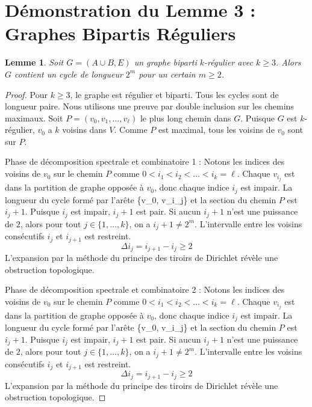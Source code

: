 \documentclass[11pt,a4paper]{article}
\newtheorem{lemma}[theorem]{Lemme}
\theoremstyle{definition}
\begin{document}
\section{Démonstration du Lemme 3 : Graphes Bipartis Réguliers}
\begin{lemma}
Soit $G = (A \cup B, E)$ un graphe biparti $k$-régulier avec $k \ge 3$. Alors $G$ contient un cycle de longueur $2^m$ pour un certain $m \ge 2$.
\end{lemma}
\begin{proof}
Pour $k \ge 3$, le graphe est régulier et biparti. Tous les cycles sont de longueur paire.
Nous utilisons une preuve par double inclusion sur les chemins maximaux.
Soit $P = (v_0, v_1, \dots, v_\ell)$ le plus long chemin dans $G$.
Puisque $G$ est $k$-régulier, $v_0$ a $k$ voisins dans $V$. Comme $P$ est maximal, tous les voisins de $v_0$ sont sur $P$.

Phase de décomposition spectrale et combinatoire 1 :
Notons les indices des voisins de $v_0$ sur le chemin $P$ comme $0 < i_1 < i_2 < \dots < i_k = \ell$.
Chaque $v_{i_j}$ est dans la partition de graphe opposée à $v_0$, donc chaque indice $i_j$ est impair.
La longueur du cycle formé par l'arête \{v_0, v_{i_j}\} et la section du chemin $P$ est $i_j + 1$.
Puisque $i_j$ est impair, $i_j + 1$ est pair.
Si aucun $i_j + 1$ n'est une puissance de $2$, alors pour tout $j \in \{1, \dots, k\}$, on a $i_j + 1 \neq 2^m$.
L'intervalle entre les voisins consécutifs $i_j$ et $i_{j+1}$ est restreint.
\begin{equation}
\Delta i_j = i_{j+1} - i_j \ge 2
\end{equation}
L'expansion par la méthode du principe des tiroirs de Dirichlet révèle une obstruction topologique.

Phase de décomposition spectrale et combinatoire 2 :
Notons les indices des voisins de $v_0$ sur le chemin $P$ comme $0 < i_1 < i_2 < \dots < i_k = \ell$.
Chaque $v_{i_j}$ est dans la partition de graphe opposée à $v_0$, donc chaque indice $i_j$ est impair.
La longueur du cycle formé par l'arête \{v_0, v_{i_j}\} et la section du chemin $P$ est $i_j + 1$.
Puisque $i_j$ est impair, $i_j + 1$ est pair.
Si aucun $i_j + 1$ n'est une puissance de $2$, alors pour tout $j \in \{1, \dots, k\}$, on a $i_j + 1 \neq 2^m$.
L'intervalle entre les voisins consécutifs $i_j$ et $i_{j+1}$ est restreint.
\begin{equation}
\Delta i_j = i_{j+1} - i_j \ge 2
\end{equation}
L'expansion par la méthode du principe des tiroirs de Dirichlet révèle une obstruction topologique.


\end{proof}
\end{document}
